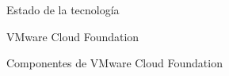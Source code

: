 \begin{section}{Estado de la tecnología}
\begin{subsection}{VMware Cloud Foundation}

\end{subsection}

\begin{subsection}{Componentes de VMware Cloud Foundation \cite{componentesCloudFound}}
\label{subsubsect:cfcomponents}


\end{subsection}
\end{section}
